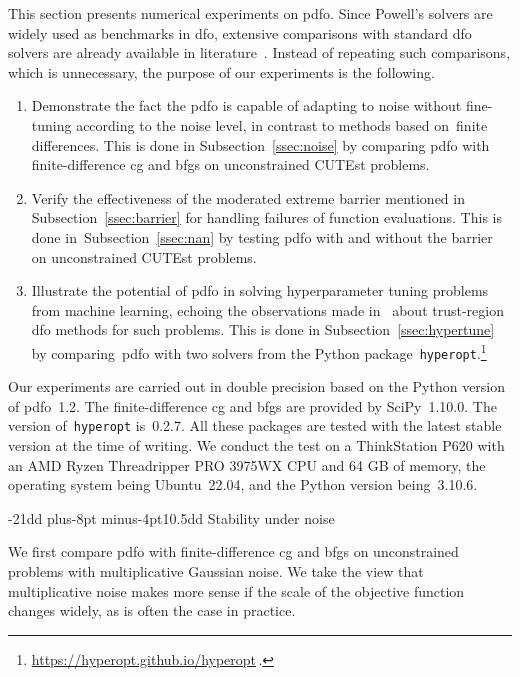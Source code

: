 \documentclass[
    smallextended,  %
    final,          %
]{svjour3}
\makeatletter
\def\subsection{\@startsection{subsection}{2}{\z@}%
    {-21dd plus-8pt minus-4pt}{10.5dd}
     {\normalsize\bfseries}}
\makeatother
\begin{document}
This section presents numerical experiments on \gls{pdfo}.
Since Powell's solvers are widely used as benchmarks in \gls{dfo},
extensive comparisons with standard \gls{dfo} solvers are
already available in literature~\cite{More_Wild_2009,Rios_Sahinidis_2013}.
Instead of repeating such comparisons, which is unnecessary,
the purpose of our experiments is the following.
\begin{enumerate}
    \item Demonstrate the fact the \gls{pdfo} is capable of adapting to noise without fine-tuning
        according to the noise level, in contrast to methods based on~finite differences.
        This is done in Subsection~\ref{ssec:noise} by comparing \gls{pdfo} with finite-difference
        \gls{cg} and \gls{bfgs} on unconstrained CUTEst problems.
    \item Verify the effectiveness of the moderated extreme barrier mentioned in
        Subsection~\ref{ssec:barrier} for handling failures of function
        evaluations. This is done in~Subsection~\ref{ssec:nan} by testing \gls{pdfo} with and
        without the barrier on unconstrained CUTEst problems.
    \item Illustrate the potential of \gls{pdfo} in solving hyperparameter tuning problems from
        machine learning, echoing the observations made in~\cite{Ghanbari_Scheinberg_2017} about
        trust-region \gls{dfo} methods for such problems.
        This is done in Subsection~\ref{ssec:hypertune} by comparing~\gls{pdfo} with two solvers
        from the Python package~\texttt{hyperopt}.\footnote{\url{https://hyperopt.github.io/hyperopt}\,.}
\end{enumerate}

Our experiments are carried out in double precision based on the Python version of \gls{pdfo}~1.2.
The finite-difference \gls{cg} and \gls{bfgs} are provided by SciPy~1.10.0.
The version of~\texttt{hyperopt} is~0.2.7. All these packages are tested with the latest stable version
at the time of writing.
We conduct the test on a ThinkStation P620 with an AMD Ryzen Threadripper
PRO 3975WX CPU and 64 GB of memory, the operating system being Ubuntu~22.04, and the Python version
being~3.10.6.


\subsection{Stability under noise}
\label{ssec:noise}

We first compare \gls{pdfo} with finite-difference \gls{cg} and \gls{bfgs} on unconstrained
problems with multiplicative Gaussian noise.
We take the view that multiplicative noise makes more sense if the scale of the objective
function changes widely, as is often the case in practice.
\end{document}
